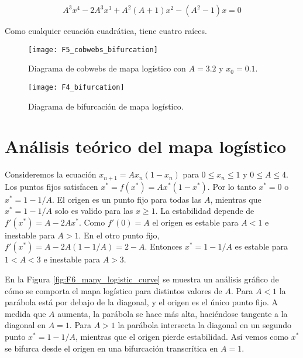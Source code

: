 \begin{itemize}
                \begin{equation}
                    A^{3} x^{4} - 2 A^{3} x^{3} + A^{2} (A + 1) x^{2} - (A^{2} -1)x = 0
                \end{equation}

                Como cualquier ecuación cuadrática, tiene cuatro raíces. 


                


        \begin{figure}[hbtp]
            \caption{Diagrama de cobwebs de mapa logístico con $A = 3.2$ y $x_{0} = 0.1$.}
            \centering
            \texttt{[image: F5\_cobwebs\_bifurcation]}
            \label{fig:F5_cobwebs_bifurcation}
        \end{figure}


        \begin{figure}[hbtp]
            \caption{Diagrama de bifurcación de mapa logístico.}
            \centering
            \texttt{[image: F4\_bifurcation]}
            \label{fig:F4_bifurcation}
        \end{figure}


        \end{itemize}

    \newpage
    \section{Análisis teórico del mapa logístico}

        Consideremos la ecuación $x_{n+1} = A x_{n} (1 - x_{n})$ para $0 \leq x_{n} \leq 1$ y $0 \leq A \leq 4$. Los puntos fijos satisfacen $x^{*} = f(x^{*}) = A x^{*}(1 - x^{*})$. Por lo tanto $x^{*} = 0$  o $x^{*} = 1 - 1/A$. El origen es un punto fijo para todas las $A$, mientras que $x^{*} = 1 - 1/A$ solo es valido para las $x \geq 1$. La estabilidad depende de $f'(x^{*}) = A - 2Ax^{*}$. Como $f'(0) = A $ el origen es estable para $A < 1$ e inestable para $A > 1$. En el otro punto fijo, $f'(x^{*}) = A - 2 A \left( 1 - 1/A \right) = 2 - A$. Entonces $x^{*} = 1 - 1/A$ es estable para $1 < A < 3$ e inestable para $A > 3$.

        En la Figura \ref{fig:F6_many_logistic_curve} se muestra un análisis gráfico de cómo se comporta el mapa logístico para distintos valores de $A$. Para $A < 1$ la parábola está por debajo de la diagonal, y el origen es el único punto fijo. A medida que $A$ aumenta, la parábola se hace más alta, haciéndose tangente a la diagonal en $A = 1$. Para $A > 1$ la parábola intersecta la diagonal en un segundo punto $x^{*} = 1 - 1/A$, mientras que el origen pierde estabilidad. Así vemos como $x^{*}$ se bifurca desde el origen en una bifurcación transcrítica en $A = 1$. 

